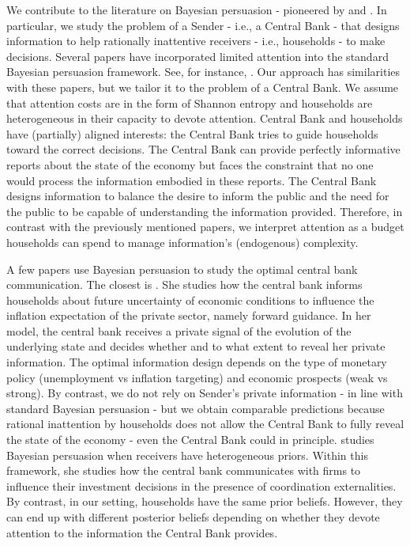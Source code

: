 \documentclass[12pt,a4paper]{article}
\begin{document}
We contribute to the literature on Bayesian persuasion - pioneered by \cite{aumann1995repeated} and \cite{KG2011}. In particular, we study the problem of a Sender - i.e., a Central Bank - that designs information to help rationally inattentive \citep{Sims2003} receivers - i.e., households - to make decisions. Several papers have incorporated limited attention into the standard Bayesian persuasion framework. See, for instance, \cite{Bloedel2020,Lipnowski2020,lipnowski2022,Wei2021,Matyskova2021,innocenti2022can}. Our approach has similarities with these papers, but we tailor it to the problem of a Central Bank. We assume that attention costs are in the form of Shannon entropy and households are heterogeneous in their capacity to devote attention. Central Bank and households have (partially) aligned interests: the Central Bank tries to guide households toward the correct decisions. The Central Bank can provide perfectly informative reports about the state of the economy but faces the constraint that no one would process the information embodied in these reports. The Central Bank designs information to balance the desire to inform the public and the need for the public to be capable of understanding the information provided. Therefore, in contrast with the previously mentioned papers, we interpret attention as a budget households can spend to manage information's (endogenous) complexity.

A few papers use Bayesian persuasion to study the optimal central bank communication. The closest is \cite{Ko2022}. She studies how the central bank informs households about future uncertainty of economic conditions to influence the inflation expectation of the private sector, namely forward guidance. In her model, the central bank receives a private signal of the evolution of the underlying state and decides whether and to what extent to reveal her private information. The optimal information design depends on the type of monetary policy (unemployment vs inflation targeting) and economic prospects (weak vs strong). By contrast, we do not rely on Sender's private information - in line with standard Bayesian persuasion - but we obtain comparable predictions because rational inattention by households does not allow the Central Bank to fully reveal the state of the economy - even the Central Bank could in principle.
\cite{Herbert2021} studies Bayesian persuasion when receivers have heterogeneous priors. Within this framework, she studies how the central bank communicates with firms to influence their investment decisions in the presence of coordination externalities. By contrast, in our setting, households have the same prior beliefs. However, they can end up with different posterior beliefs depending on whether they devote attention to the information the Central Bank provides.
\end{document}
